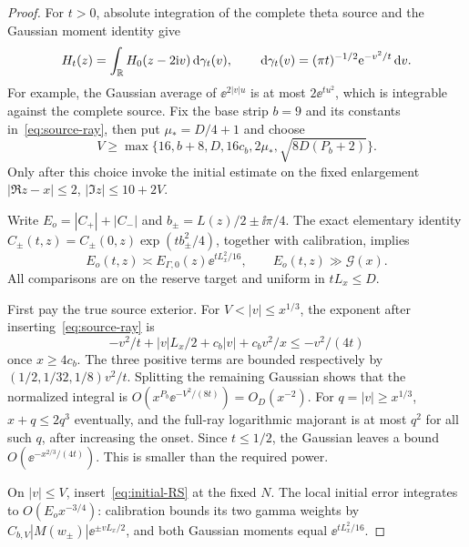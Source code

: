 \begin{proof}
For $t>0$, absolute integration of the complete theta source and the
Gaussian moment identity give
\begin{equation}\label{eq:gaussian-heat}
 H_t(z)=\int_\mathbb R H_0(z-2\mathrm i v)\,\mathrm d\gamma_t(v),\qquad
 \,\mathrm d\gamma_t(v)=(\pi t)^{-1/2}\mathrm e^{-v^2/t}\,\mathrm d v.
\end{equation}
For example, the Gaussian average of $\ee^{2|v|u}$ is at most
$2\ee^{tu^2}$, which is integrable against the complete source.
Fix the base strip $b=9$ and its constants in~\eqref{eq:source-ray},
then put $\mu_*=D/4+1$ and choose
\begin{equation}\label{eq:window-choice}
 V\ge\max\{16,b+8,D,16c_b,2\mu_*,\sqrt{8D(P_b+2)}\}.
\end{equation}
Only after this choice invoke the initial estimate on the fixed
enlargement $|\Re z-x|\le2$, $|\Im z|\le10+2V$.

Write $E_o=|C_+|+|C_-|$ and $b_\pm=L(z)/2\pm\ii\pi/4$.
The exact elementary identity
$C_\pm(t,z)=C_\pm(0,z)\exp(tb_\pm^2/4)$, together with calibration,
implies
\begin{equation}\label{eq:envelope-comparison}
 E_o(t,z)\asymp E_{\Gamma,0}(z)\ee^{tL_x^2/16},
 \qquad E_o(t,z)\gg\mathcal G(x).
\end{equation}
All comparisons are on the reserve target and uniform in $tL_x\le D$.

First pay the true source exterior. For $V<|v|\le x^{1/3}$,
the exponent after inserting~\eqref{eq:source-ray} is
\[
 -v^2/t+|v|L_x/2+c_b|v|+c_bv^2/x\le-v^2/(4t)
\]
once $x\ge4c_b$. The three positive terms are bounded respectively
by $(1/2,1/32,1/8)v^2/t$. Splitting the remaining Gaussian shows that
the normalized integral is
$O(x^{P_b}\ee^{-V^2/(8t)})=O_D(x^{-2})$.
For $q=|v|\ge x^{1/3}$, $x+q\le2q^3$ eventually, and the full-ray
logarithmic majorant is at most $q^2$ for all such $q$, after increasing
the onset. Since $t\le1/2$, the Gaussian leaves a bound
$O(\ee^{-x^{2/3}/(4t)})$. This is smaller than the required power.

On $|v|\le V$, insert~\eqref{eq:initial-RS} at the fixed $N$.
The local initial error integrates to $O(E_ox^{-3/4})$: calibration
bounds its two gamma weights by
$C_{b,V}|M(w_\pm)|\ee^{\pm vL_x/2}$, and both Gaussian moments equal
$\ee^{tL_x^2/16}$.


\end{proof}
